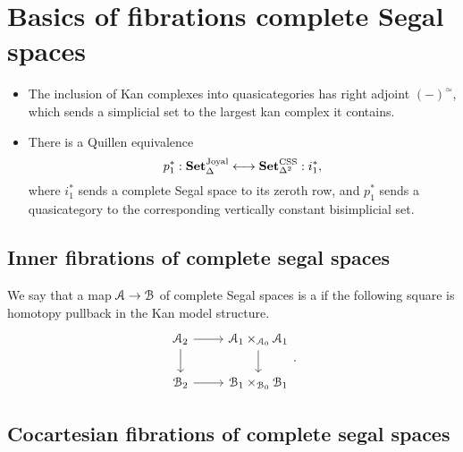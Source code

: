 \documentclass[main.tex]{subfiles}
\begin{document}
\section{Basics of fibrations complete Segal spaces}

\begin{itemize}
  \item The inclusion of Kan complexes into quasicategories has right adjoint $(-)^{\simeq}$, which sends a simplicial set to the largest kan complex it contains.

  \item There is a Quillen equivalence
    \begin{equation*}
      p_{1}^{*} : \mathbf{Set}_{\Delta}^{\mathrm{Joyal}} \longleftrightarrow \mathbf{Set}_{\Delta^{2}}^{\mathrm{CSS}} : i_{1}^{*},
    \end{equation*}
    where $i_{1}^{*}$ sends a complete Segal space to its zeroth row, and $p_{1}^{*}$ sends a quasicategory to the corresponding vertically constant bisimplicial set.
\end{itemize}

\subsection{Inner fibrations of complete segal spaces}
\label{ssc:inner_fibrations_of_complete_segal_spaces}

\begin{definition}
  We say that a map $\mathcal{A} \to \mathcal{B}$ of complete Segal spaces is a  if the following square is homotopy pullback in the Kan model structure.
  \begin{equation*}
    \begin{tikzcd}
      \category{A}_{2}
      \arrow[r]
      \arrow[d]
      & \category{A}_{1} \times_{\category{A}_{0}} \category{A}_{1}
      \arrow[d]
      \\
      \category{B}_{2}
      \arrow[r]
      & \category{B}_{1} \times_{\category{B}_{0}} \category{B}_{1}
    \end{tikzcd}.
  \end{equation*}
\end{definition}

\subsection{Cocartesian fibrations of complete segal spaces}
\label{ssc:cocartesian_fibrations_of_complete_segal_spaces}
\end{document}

